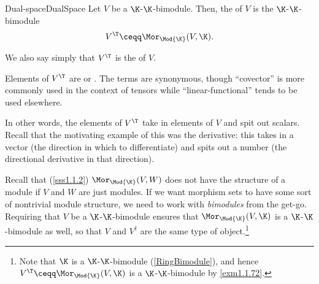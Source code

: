\begin{dfn}{Dual-space}{DualSpace}
	Let $V$ be a $\K$-$\K$-bimodule.  Then, the  of $V$ is the $\K$-$\K$-bimodule
	\begin{equation}
	V^{\T}\ceqq \Mor _{\Mod{\K}}(V,\K ).
	\end{equation}
	\begin{rmk}
		We also say simply that $V^{\T}$ is the  of $V$.
	\end{rmk}
	\begin{rmk}
		Elements of $V^{\T}$ are  or .  The terms are synonymous, though ``covector'' is more commonly used in the context of tensors while ``linear-functional'' tends to be used elsewhere.
	\end{rmk}
	\begin{rmk}
		In other words, the elements of $V^{\T}$ take in elements of $V$ and spit out scalars.  Recall that the motivating example of this was the derivative:  this takes in a vector (the direction in which to differentiate) and spits out a number (the directional derivative in that direction).
	\end{rmk}
	\begin{rmk}
		Recall that (\cref{sss1.1.2}) $\Mor _{\Mod{\K}}(V,W)$ does not have the structure of a module if $V$ and $W$ are just modules.  If we want morphism sets to have some sort of nontrivial module structure, we need to work with \emph{bimodules} from the get-go.  Requiring that $V$ be a $\K$-$\K$-bimodule ensures that $\Mor _{\Mod{\K}}(V,\K )$ is a $\K$-$\K$-bimodule as well, so that $V$ and $V^{\dagger}$ are the same type of object.\footnote{Note that $\K$ is a $\K$-$\K$-bimodule (\cref{RingBimodule}), and hence $V^{\T}\ceqq \Mor _{\Mod{\K}}(V,\K )$ is a $\K$-$\K$-bimodule by \cref{exm1.1.72}.}
		

\end{rmk}
\end{dfn}
